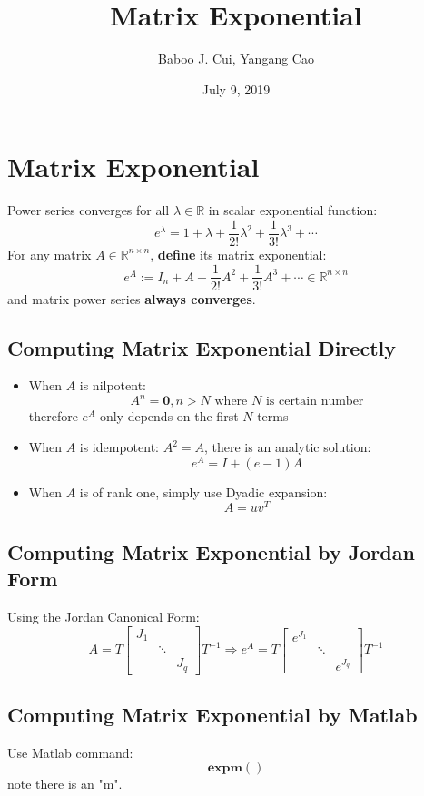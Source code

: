 \documentclass[10pt,a4paper,oneside]{article}
\date{July 9, 2019}
\author{Baboo J. Cui, Yangang Cao}
\title{Matrix Exponential}
\begin{document}
\maketitle
\tableofcontents
\newpage
\section{Matrix Exponential}
Power series converges for all $\lambda\in\mathbb{R}$ in scalar exponential function:
\[
e^{\lambda}=1+\lambda+\frac{1}{2 !} \lambda^{2}+\frac{1}{3 !} \lambda^{3}+\cdots
\]
For any matrix $A \in \mathbb{R}^{n \times n}$, \textbf{define} its matrix exponential:
\[
e^{A} :=I_{n}+A+\frac{1}{2 !} A^{2}+\frac{1}{3 !} A^{3}+\cdots \in \mathbb{R}^{n \times n}
\]
and matrix power series \textbf{always converges}.

\subsection{Computing Matrix Exponential Directly}
\begin{itemize}
\item When $A$ is nilpotent:
\[
A^n = \mathbf{0}, n>N \text{ where $N$ is certain number}
\]
therefore $e^A$ only depends on the first $N$ terms
\item When $A$ is idempotent: $A^{2}=A$, there is an analytic solution:
\[
e^A = I + (e-1)A
\]
\item When $A$ is of rank one, simply use Dyadic expansion:
\[
A = uv^T
\]
\end{itemize}

\subsection{Computing Matrix Exponential by Jordan Form}
Using the Jordan Canonical Form:
\[
A=T\left[\begin{array}{lll}{J_{1}} & {} \\ {} & {\ddots} & {} \\ {} & {} & {J_{q}}\end{array}\right] T^{-1} \Rightarrow e^{A}=T\left[\begin{array}{ccc}{e^{J_{1}}} & {} & {} \\ {} & {\ddots} & {} \\ {} & {} & {e^{J_{q}}}\end{array}\right] T^{-1}
\]
\subsection{Computing Matrix Exponential by Matlab}
Use Matlab command:
\[
\mathbf{expm}()
\]
note there is an "m".
\end{document}
